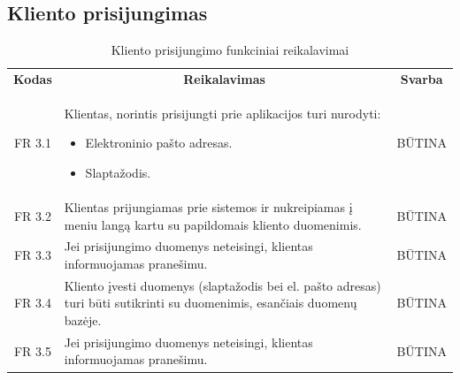 \documentclass{VUMIFPSkursinis}
\begin{document}
\subsection{Kliento prisijungimas}

\begin{center}
	\begin{table}[H]
	\caption{Kliento prisijungimo funkciniai reikalavimai}
	\begin{tabular}{|p{2cm}|p{}|p{}|}
	\hline
	    \rowcolor{lightgray}
		\multicolumn{3}{|c|}{Kliento prisijungimas}\\
		
	\hline
		\multicolumn{1}{|c|}{{\bfseries Kodas}}&
		\multicolumn{1}{|c|}{{\bfseries Reikalavimas}}&
		\multicolumn{1}{|c|}{{\bfseries Svarba}}\\

	\hline
	
		\multicolumn{1}{|c|}{FR 3.1}&
		{Klientas, norintis prisijungti prie aplikacijos turi nurodyti:
			\begin{itemize}
				\item Elektroninio pašto adresas.
				\item Slaptažodis.
			\end{itemize}
		}&
		\multicolumn{1}{|c|}{BŪTINA}\\	
		
	\hline	
		\multicolumn{1}{|c|}{FR 3.2}&
		{Klientas prijungiamas prie sistemos ir nukreipiamas į meniu langą kartu su papildomais kliento duomenimis.}&
		\multicolumn{1}{|c|}{BŪTINA}\\
		
	\hline	
		\multicolumn{1}{|c|}{FR 3.3}&
		{Jei prisijungimo duomenys neteisingi, klientas informuojamas pranešimu.}&
		\multicolumn{1}{|c|}{BŪTINA}\\		
		
	\hline
		\multicolumn{1}{|c|}{FR 3.4}&
		{Kliento įvesti duomenys (slaptažodis bei el. pašto adresas) turi būti sutikrinti su duomenimis, esančiais duomenų bazėje.}&
		\multicolumn{1}{|c|}{BŪTINA}\\
		
	\hline	
		\multicolumn{1}{|c|}{FR 3.5}&
		{Jei prisijungimo duomenys neteisingi, klientas informuojamas pranešimu.}&
		\multicolumn{1}{|c|}{BŪTINA}\\
	\hline
	
	
	
	\end{tabular}	
	
	\label{table:VartotojoPrisijungimas}		
	\end{table}

\end{center}
\pagebreak
\end{document}
